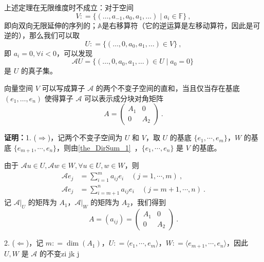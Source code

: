 \begin{example}{}
上述定理在无限维度时不成立：对于空间
$$
V: = \{ (\dots, a_{-1}, a_0, a_1, \dots) \mid a_i \in \mathbb{F}\}~,
$$
即向双向无限延伸的序列的；$\mathbb{A}$是右移算符（它的逆运算是左移动算符，因此是可逆的），那么我们可以取
$$
U: = \{ (\dots, 0, a_0, a_1, \dots) \in V \}~,
$$
即 $a_i = 0, \forall i < 0$，可以发现
$$
\mathcal{A} U = \{ (\dots, 0, a_0, a_1, \dots) \in U \mid a_0 = 0 \}~
$$
是 $U$ 的真子集。
\end{example}


\begin{theorem}{}\label{the_InvSP_1}
向量空间 $V$ 可以写成算子 $\mathcal{A}$ 的两个不变子空间的直和，当且仅当存在基底 $(e_1, \dots, e_n)$ 使得算子 $\mathcal{A}$ 可以表示成分块对角矩阵
\begin{equation}
A=\begin{pmatrix}
A_1 & 0\\
0 & A_2
\end{pmatrix}~.
\end{equation}

\end{theorem}

\textbf{证明：}1. ($\Rightarrow$)，记两个不变子空间为 $U$ 和 $V$，取 $U$ 的基底 $\{e_1 ,\cdots, e_m\}$，$W$ 的基底 $\{e_{m+1}, \cdots, e_n\}$，则由\autoref{the_DirSum_1}~，$\{e_{1}, \cdots, e_n\}$ 是 $V$ 的基底。

由于 $\mathcal{A}u\in U, \mathcal{A} w\in W,\forall  u\in U, w\in W$，则
\begin{equation}\label{eq_InvSP_2}
\begin{aligned}
\mathcal{A} e_j&=\sum_{i=1}^m a_{ij} e_i\quad (j=1,\cdots ,m)~,\\
\mathcal{A} e_j&=\sum_{i=m+1}^n a_{ij} e_i\quad (j=m+1,\cdots ,n)~.
\end{aligned}
\end{equation}
记 $\mathcal{A}|_U$ 的矩阵为 $A_1$，$\mathcal{A}|_W$ 的矩阵为 $A_2$，我们得到
\begin{equation}
A=(a_{ij})=\begin{pmatrix}
A_1 & 0\\
0 & A_2
\end{pmatrix}~.
\end{equation}

2. ($\Leftarrow$)，记 $m: = \dim(A_1)$，$U: = \langle e_1, \cdots, e_m\rangle$，$W: = \langle e_{m + 1}, \cdots, e_n\rangle$，因此 $U, W$ 是 $\mathcal{A}$ 的不变zi jk j

